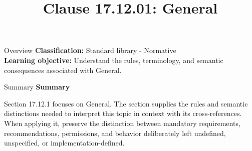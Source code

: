 \documentclass[10pt,letterpaper]{article}
\title{Clause 17.12.01: General}
\author{}
\date{}
\begin{document}
\maketitle
\begin{CornellOverviewBox}{Overview}
\textbf{Classification:} Standard library - Normative\\[2pt]
\textbf{Learning objective:} Understand the rules, terminology, and semantic consequences associated with General.
\end{CornellOverviewBox}\begin{CornellSummaryBox}{Summary}
{\sffamily\bfseries\color{Accent} Summary}\par\vspace{3pt}Section 17.12.1 focuses on General. The section supplies the rules and semantic distinctions needed to interpret this topic in context with its cross-references. When applying it, preserve the distinction between mandatory requirements, recommendations, permissions, and behavior deliberately left undefined, unspecified, or implementation-defined.
\end{CornellSummaryBox}
\end{document}
